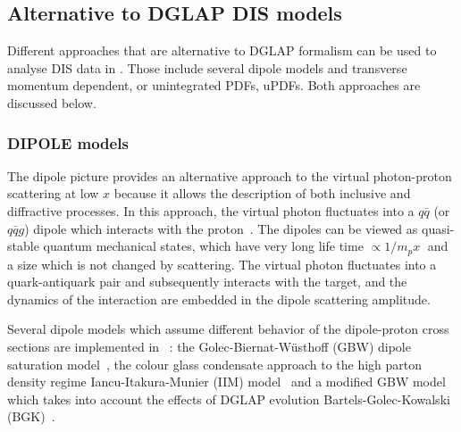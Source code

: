 \subsection{Alternative to DGLAP DIS models}
Different approaches that are alternative to DGLAP formalism can be used to analyse DIS data in \fitter .
Those include several dipole models and transverse momentum dependent, or unintegrated PDFs, uPDFs.
Both approaches are discussed below.

\subsubsection{DIPOLE models}

The dipole picture provides an alternative approach to the virtual photon-proton
 scattering at low $x$  because it allows the description of both inclusive and 
diffractive processes.
 In this approach, the virtual photon fluctuates into a $q\bar q$ (or $q\bar q g$) 
 dipole which interacts with the proton~\cite{NNZ:91}.  
The dipoles can be viewed as quasi-stable quantum mechanical states, which have very long 
life time $\propto 1/m_p x\;$ and a size which is not changed by scattering.
The virtual photon fluctuates into a quark-antiquark pair and subsequently interacts with the target, 
and the dynamics of the interaction are embedded in the dipole scattering amplitude.


Several dipole models which assume different behavior of the dipole-proton 
cross sections are implemented in \fitter\ :
the Golec-Biernat-W\"usthoff (GBW)
dipole saturation model~\cite{Golec-Biernat:1998js},
the colour glass condensate approach to the high parton density 
regime Iancu-Itakura-Munier (IIM) model~\cite{Iancu:2003ge} and 
a modified GBW model which takes into account the effects of  
DGLAP evolution Bartels-Golec-Kowalski (BGK)~\cite{Bartels:2002cj}.

